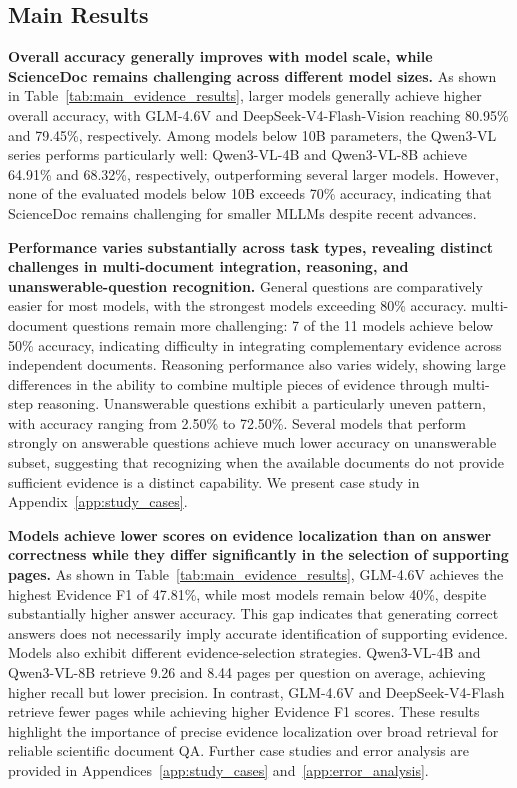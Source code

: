\documentclass{article} %
\begin{document}
\subsection{Main Results}

\textbf{Overall accuracy generally improves with model scale, while ScienceDoc remains challenging across different model sizes.}
As shown in Table~\ref{tab:main_evidence_results}, larger models generally achieve higher overall accuracy, with GLM-4.6V and DeepSeek-V4-Flash-Vision reaching 80.95\% and 79.45\%, respectively. Among models below 10B parameters, the Qwen3-VL series performs particularly well: Qwen3-VL-4B and Qwen3-VL-8B achieve 64.91\% and 68.32\%, respectively, outperforming several larger models. However, none of the evaluated models below 10B exceeds 70\% accuracy, indicating that ScienceDoc remains challenging for smaller MLLMs despite recent advances.

\textbf{Performance varies substantially across task types, revealing distinct challenges in multi-document integration, reasoning, and unanswerable-question recognition.}
General questions are comparatively easier for most models, with the strongest models exceeding 80\% accuracy. multi-document questions remain more challenging: 7 of the 11 models achieve below 50\% accuracy, indicating difficulty in integrating complementary evidence across independent documents. Reasoning performance also varies widely, showing large differences in the ability to combine multiple pieces of evidence through multi-step reasoning. Unanswerable questions exhibit a particularly uneven pattern, with accuracy ranging from 2.50\% to 72.50\%. Several models that perform strongly on answerable questions achieve much lower accuracy on unanswerable subset, suggesting that recognizing when the available documents do not provide sufficient evidence is a distinct capability. We present case study in Appendix~\ref{app:study_cases}.

\textbf{Models achieve lower scores on evidence localization than on answer correctness while they differ significantly in the selection of supporting pages.}
As shown in Table~\ref{tab:main_evidence_results}, GLM-4.6V achieves the highest Evidence F1 of 47.81\%, while most models remain below 40\%, despite substantially higher answer accuracy. This gap indicates that generating correct answers does not necessarily imply accurate identification of supporting evidence. Models also exhibit different evidence-selection strategies. Qwen3-VL-4B and Qwen3-VL-8B retrieve 9.26 and 8.44 pages per question on average, achieving higher recall but lower precision. In contrast, GLM-4.6V and DeepSeek-V4-Flash retrieve fewer pages while achieving higher Evidence F1 scores. These results highlight the importance of precise evidence localization over broad retrieval for reliable scientific document QA. Further case studies and error analysis are provided in Appendices~\ref{app:study_cases} and~\ref{app:error_analysis}.
\end{document}

